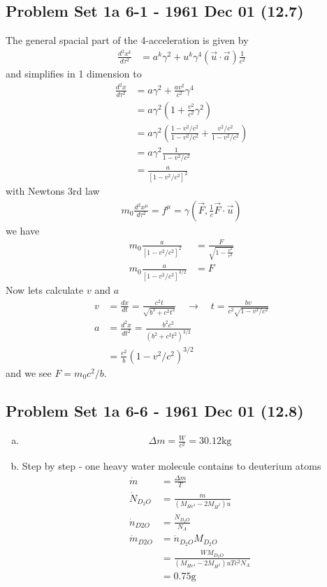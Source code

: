 \documentclass[10pt,a4paper]{book}
\theoremstyle{definition}
\begin{document}
\subsection{Problem Set 1a 6-1 - 1961 Dec 01 (12.7)}
The general spacial part of the 4-acceleration is given by
\begin{align}
\frac{d^2x^k}{d\tau^2}
&=a^k\gamma^2+u^k\gamma^4(\vec{u}\cdot\vec{a})\frac{1}{c^2}
\end{align}
and simplifies in 1 dimension to
\begin{align}
\frac{d^2x}{d\tau^2}
&=a\gamma^2+\frac{av^2}{c^2}\gamma^4\\
&=a\gamma^2\left(1+\frac{v^2}{c^2}\gamma^2\right)\\
&=a\gamma^2\left(\frac{1-v^2/c^2}{1-v^2/c^2}+\frac{v^2/c^2}{1-v^2/c^2}\right)\\
&=a\gamma^2\frac{1}{1-v^2/c^2}\\
&=\frac{a}{[1-v^2/c^2]^2}
\end{align}
with Newtons 3rd law
\begin{align}
m_0\frac{d^2x^\mu}{d\tau^2}=f^\mu=\gamma(\vec{F},\frac{1}{c}\vec{F}\cdot\vec{u})
\end{align}
we have
\begin{align}
m_0\frac{a}{[1-v^2/c^2]^2}&=\frac{F}{\sqrt{1-\frac{v^2}{c^2}}}\\
m_0\frac{a}{[1-v^2/c^2]^{3/2}}&=F
\end{align}
Now lets calculate $v$ and $a$
\begin{align}
v&=\frac{dx}{dt}=\frac{c^2t}{\sqrt{b^2+c^2t^2}}\quad\rightarrow\quad t=\frac{bv}{c^2\sqrt{1-v^2/c^2}}\\
a&=\frac{d^2x}{dt^2}=\frac{b^2c^2}{(b^2+c^2t^2)^{3/2}}\\
&=\frac{c^2}{b}(1-v^2/c^2)^{3/2}
\end{align}
and we see $F=m_0c^2/b$.

\subsection{Problem Set 1a 6-6 - 1961 Dec 01 (12.8)}
\begin{enumerate}[a)]
\item
\begin{align}
\Delta m=\frac{W}{c^2}=30.12\text{kg}
\end{align}

\item Step by step - one heavy water molecule contains to deuterium atoms
\begin{align}
\dot{m}&=\frac{\Delta m}{T}\\
\dot{N}_{D_2O}&=\frac{\dot{m}}{(M_{He^4}-2M_{H^2})u}\\
\dot{n}_{D2O}&=\frac{\dot{N}_{D_2O}}{N_A}\\
\dot{m}_{D2O}&=\dot{n}_{D_2O}M_{D_2O}\\
&=\frac{WM_{D_2O}}{(M_{He^4}-2M_{H^2})uTc^2N_A}\\
&=0.75\text{g}
\end{align}
\end{enumerate}
\end{document}
